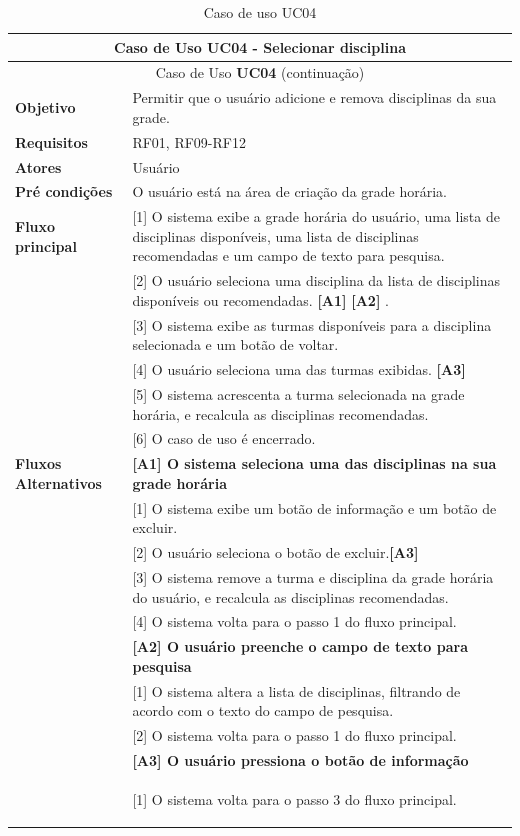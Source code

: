 \begin{longtable}{ | m{} | m{} | }
    
    \hline\hline
    \multicolumn{2}{|c|}{Caso de Uso \textbf{UC04} - Selecionar disciplina}\tabularnewline\hline\hline\endfirsthead
    \hline\hline
    \multicolumn{2}{|c|}{Caso de Uso \textbf{UC04} (continuação)}\tabularnewline\hline\hline\endhead
    \hline\endfoot
    \hline\caption{Caso de uso UC04}\endlastfoot

    \textbf{Objetivo} & Permitir que o usuário adicione e remova disciplinas da sua grade.\tabularnewline\hline
    \textbf{Requisitos} & RF01, RF09-RF12\tabularnewline\hline
    \textbf{Atores} & Usuário\tabularnewline\hline
    \textbf{Pré condições} & O usuário está na área de criação da grade horária.\tabularnewline\hline

    \multirow{1}{*}{\textbf{Fluxo principal}} & [1] O sistema exibe a grade horária do usuário, uma lista de disciplinas disponíveis, uma lista de disciplinas recomendadas e um campo de texto para pesquisa.\tabularnewline\cline{2-2}
    & [2] O usuário seleciona uma disciplina da lista de disciplinas disponíveis ou recomendadas. \textbf{[A1]} \textbf{[A2]} .\tabularnewline\cline{2-2}
    & [3] O sistema exibe as turmas disponíveis para a disciplina selecionada e um botão de voltar.\tabularnewline\cline{2-2}
    & [4] O usuário seleciona uma das turmas exibidas. \textbf{[A3]}\tabularnewline\cline{2-2}
    & [5] O sistema acrescenta a turma selecionada na grade horária, e recalcula as disciplinas recomendadas. \tabularnewline\cline{2-2}
    & [6] O caso de uso é encerrado.\tabularnewline\hline

    \multirow{1}{*}{\textbf{Fluxos Alternativos}} & \textbf{[A1] O sistema seleciona uma das disciplinas na sua grade horária}\tabularnewline\cline{2-2}
    & [1] O sistema exibe um botão de informação e um botão de excluir.\tabularnewline\cline{2-2} 
    & [2] O usuário seleciona o botão de excluir.\textbf{[A3]}\tabularnewline\cline{2-2} 
    & [3] O sistema remove a turma e disciplina da grade horária do usuário, e recalcula as disciplinas recomendadas. \tabularnewline\cline{2-2}
    & [4] O sistema volta para o passo 1 do fluxo principal. \tabularnewline\cline{2-2}

    & \textbf{[A2] O usuário preenche o campo de texto para pesquisa}\tabularnewline\cline{2-2}
    & [1] O sistema altera a lista de disciplinas, filtrando de acordo com o texto do campo de pesquisa. \tabularnewline\cline{2-2}
    & [2] O sistema volta para o passo 1 do fluxo principal. \tabularnewline\cline{2-2}

    & \textbf{[A3] O usuário pressiona o botão de informação}\tabularnewline\cline{2-2}
    & [1] O sistema volta para o passo 3 do fluxo principal. %

    \label{tab:uc04}
\end{longtable}


